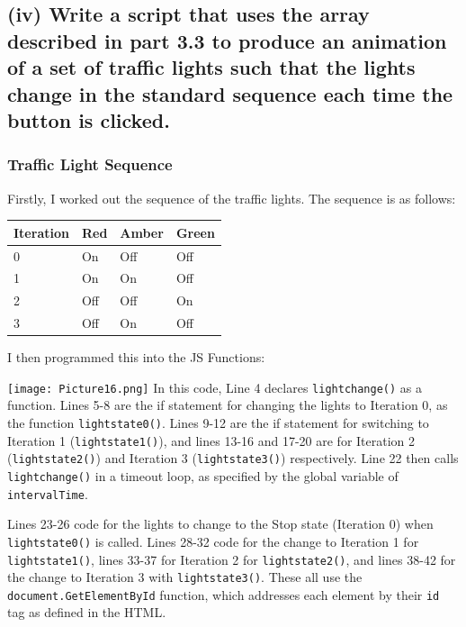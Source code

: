 \documentclass[a4paper]{article}
\begin{document}
\subsection{(iv) Write a script that uses the array described in part 3.3 to produce an animation of a set of
traffic lights such that the lights change in the standard sequence each time the button is
clicked.}
\subsubsection{Traffic Light Sequence}
Firstly, I worked out the sequence of the traffic lights. The sequence is as follows:
\begin{center}
\begin{tabular}{ | m{5em} | m{3em} | m{3em} | m{3em} | }
  \hline
  Iteration & Red & Amber & Green \\ [0.5ex] 
  \hline \hline
  0 & On & Off & Off \\
  \hline
  1 & On & On & Off \\
  \hline
  2 & Off & Off & On \\
  \hline
  3 & Off & On & Off \\
  \hline
\end{tabular}
\end{center}
I then programmed this into the JS Functions: \par
\noindent\texttt{[image: Picture16.png]}
In this code, Line 4 declares \verb|lightchange()| as a function. Lines 5-8 are the if statement for changing the lights to Iteration 0, as the function \verb|lightstate0()|. Lines 9-12 are the if statement for switching to Iteration 1 (\verb|lightstate1()|), and lines 13-16 and 17-20 are for Iteration 2 (\verb|lightstate2()|) and Iteration 3 (\verb|lightstate3()|) respectively. Line 22 then calls \verb|lightchange()| in a timeout loop, as specified by the global variable of \verb|intervalTime|.\par
Lines 23-26 code for the lights to change to the Stop state (Iteration 0) when \verb|lightstate0()| is called. Lines 28-32 code for the change to Iteration 1 for \verb|lightstate1()|, lines 33-37 for Iteration 2 for \verb|lightstate2()|, and lines 38-42 for the change to Iteration 3 with \verb|lightstate3()|. These all use the \verb|document.GetElementById| function, which addresses each element by their \verb|id| tag as defined in the HTML.
\end{document}
